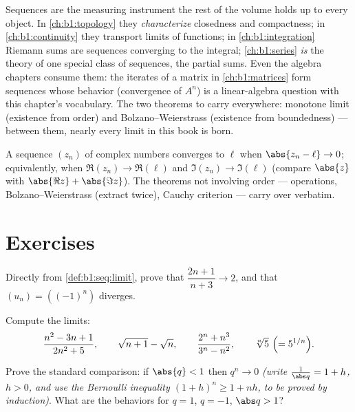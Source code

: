 \begin{remark}
Sequences are the measuring instrument the rest of the volume
holds up to every object. In \cref{ch:b1:topology} they
\emph{characterize} closedness and compactness; in
\cref{ch:b1:continuity} they transport limits of functions; in
\cref{ch:b1:integration} Riemann sums are sequences converging
to the integral; \cref{ch:b1:series} \emph{is} the theory of one
special class of sequences, the partial sums. Even the algebra
chapters consume them: the iterates of a matrix in
\cref{ch:b1:matrices} form sequences whose behavior
(convergence of $A^n$) is a linear-algebra question with this
chapter's vocabulary. The two theorems to carry everywhere:
monotone limit (existence from order) and Bolzano--Weierstrass
(existence from boundedness) --- between them, nearly every
limit in this book is born.
\end{remark}

\begin{remark}
A sequence $(z_n)$ of complex numbers converges to $\ell$ when
$\abs{z_n - \ell} \to 0$; equivalently, when $\Re(z_n) \to \Re(\ell)$
and $\Im(z_n) \to \Im(\ell)$ (compare $\abs{z}$ with $\abs{\Re z} +
\abs{\Im z}$). The theorems not involving order --- operations,
Bolzano--Weierstrass (extract twice), Cauchy criterion --- carry over
verbatim.
\end{remark}

\section{Exercises}

\begin{exercise}[$\star$]\label{exo:b1:seq:1}
Directly from \cref{def:b1:seq:limit}, prove that
$\dfrac{2n+1}{n+3} \to 2$, and that $(u_n) = ((-1)^n)$ diverges.
\end{exercise}

\begin{exercise}[$\star$]\label{exo:b1:seq:2}
Compute the limits:
\[
\frac{n^2 - 3n + 1}{2n^2 + 5},
\qquad
\sqrt{n+1} - \sqrt n,
\qquad
\frac{2^n + n^3}{3^n - n^2},
\qquad
\sqrt[n]{5}\ \Bigl(= 5^{1/n}\Bigr).
\]
\end{exercise}

\begin{exercise}[$\star$]\label{exo:b1:seq:3}
Prove the standard comparison: if $\abs{q} < 1$ then $q^n \to 0$
\emph{(write $\frac{1}{\abs q} = 1 + h$, $h > 0$, and use the
Bernoulli inequality $(1+h)^n \geq 1 + nh$, to be proved by
induction)}. What are the behaviors for $q = 1$, $q = -1$, $\abs q >
1$?
\end{exercise}

